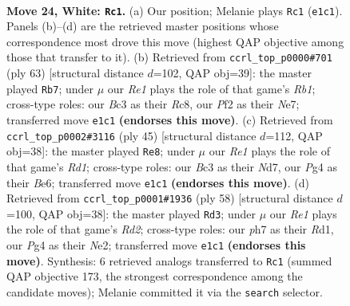 \documentclass[11pt]{article}
\begin{document}
\clearpage

\begin{figure}[p]\centering
\begin{subfigure}{0.46\textwidth}\centering
\resizebox{\linewidth}{!}{%
\newchessgame
\chessboard[
  setfen={r3r3/1ppb2kp/5p2/p2p2b1/6P1/NPB1Pn2/P4P1q/RN2RK2 w - - 0 24},
  showmover=false,
  pgfstyle=straightmove, color=movearrow, markmove={e1-c1}
]}
\caption{}
\end{subfigure}\hfill
\begin{subfigure}{0.46\textwidth}\centering
\resizebox{\linewidth}{!}{%
\newchessgame
\chessboard[
  setfen={1rr3k1/4npp1/2b1p2p/1pPnN3/3P4/3B3P/3B1PPK/1R2R3 b - - 6 32},
  showmover=false,
  pgfstyle=straightmove, color=movearrow, markmove={b8-b7}
]}
\caption{}
\end{subfigure}
\\[4pt]
\begin{subfigure}{0.46\textwidth}\centering
\resizebox{\linewidth}{!}{%
\newchessgame
\chessboard[
  setfen={r2r2k1/1p1n4/p1p1b1p1/2Pp2B1/1P1P4/2N4P/1n3PB1/R4RK1 b - - 1 23},
  showmover=false,
  pgfstyle=straightmove, color=movearrow, markmove={d8-e8}
]}
\caption{}
\end{subfigure}\hfill
\begin{subfigure}{0.46\textwidth}\centering
\resizebox{\linewidth}{!}{%
\newchessgame
\chessboard[
  setfen={2rr1k2/1p3p2/p2bb1pp/3p4/3Nn3/PB2P2P/1P1RNPP1/3R1K2 w - - 8 30},
  showmover=false,
  pgfstyle=straightmove, color=movearrow, markmove={d2-d3}
]}
\caption{}
\end{subfigure}
\caption{\textbf{Move 24, White: \texttt{Rc1}.} (a) Our position; Melanie plays \texttt{Rc1} (\texttt{e1c1}). Panels (b)--(d) are the retrieved master positions whose correspondence most drove this move (highest QAP objective among those that transfer to it). (b) Retrieved from \texttt{ccrl\_top\_p0000\#701} (ply 63) [structural distance $d$=102, QAP obj=39]: the master played \texttt{Rb7}; under $\mu$ our \emph{Re1} plays the role of that game's \emph{Rb1}; cross-type roles: our \emph{B}c3 as their \emph{R}c8, our \emph{P}f2 as their \emph{N}e7; transferred move \texttt{e1c1} \textbf{(endorses this move)}. (c) Retrieved from \texttt{ccrl\_top\_p0002\#3116} (ply 45) [structural distance $d$=112, QAP obj=38]: the master played \texttt{Re8}; under $\mu$ our \emph{Re1} plays the role of that game's \emph{Rd1}; cross-type roles: our \emph{B}c3 as their \emph{N}d7, our \emph{P}g4 as their \emph{B}e6; transferred move \texttt{e1c1} \textbf{(endorses this move)}. (d) Retrieved from \texttt{ccrl\_top\_p0001\#1936} (ply 58) [structural distance $d$=100, QAP obj=38]: the master played \texttt{Rd3}; under $\mu$ our \emph{Re1} plays the role of that game's \emph{Rd2}; cross-type roles: our \emph{p}h7 as their \emph{R}d1, our \emph{P}g4 as their \emph{N}e2; transferred move \texttt{e1c1} \textbf{(endorses this move)}. Synthesis: 6 retrieved analogs transferred to \texttt{Rc1} (summed QAP objective 173, the strongest correspondence among the candidate moves); Melanie committed it via the \texttt{search} selector.}
\label{fig:thought-m46}
\end{figure}
\end{document}
